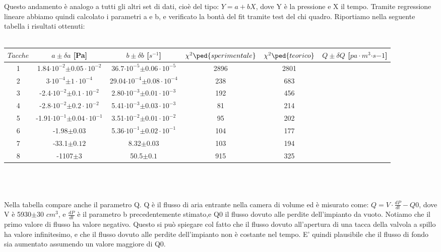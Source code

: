 \documentclass[a4paper,11pt]{article}
\begin{document}
Questo andamento è analogo a tutti gli altri set di dati, cioè del tipo: $Y=a+bX$, dove Y è la pressione e X il tempo. Tramite regressione lineare abbiamo quindi calcolato i parametri a e b, e verificato la bontà del fit tramite test del chi quadro. Riportiamo nella seguente tabella i risultati ottenuti:\\
\vspace{10 px}\\

\begin{tabular}{|c|c|c|c|c|c|}
\hline $Tacche$ & $a\pm$$\delta a$ [Pa] & $b\pm$$\delta b$ [$s^{-1}$] & $\chi^{2}\ped{sperimentale}$ & $\chi^{2}\ped{teorico}$ & $Q\pm\delta Q$ [$pa\cdot m^{3}$$\cdot s{-1}$] \\ 
\hline 1 & 1.84$\cdot10^{-2}$$\pm 0.05\cdot10^{-2}$ &  36.7$\cdot10^{-5}$$\pm 0.06\cdot10^{-5}$ & 2896 & 2801 &  \\ 
\hline 2 & 3$\cdot10^{-4}$$\pm 1\cdot10^{-4}$ & 29.04$\cdot10^{-4}$$\pm 0.08\cdot10^{-4}$ & 238 & 683 &  \\ 
\hline 3 & -2.4$\cdot10^{-2}$$\pm 0.1\cdot10^{-2}$ &  2.80$\cdot10^{-3}$$\pm 0.01\cdot10^{-3}$ & 192 & 456 &  \\ 
\hline 4 & -2.8$\cdot10^{-2}$$\pm 0.2\cdot10^{-2}$ &  5.41$\cdot10^{-3}$$\pm 0.03\cdot10^{-3}$ & 81 & 214 &  \\ 
\hline 5 & -1.91$\cdot10^{-1}$$\pm 0.04\cdot10^{-1}$ & 3.51$\cdot10^{-2}$$\pm 0.01\cdot10^{-2}$ & 95 & 202 &  \\ 
\hline 6 & -1.98$\pm 0.03$  & 5.36$\cdot10^{-1}$$\pm 0.02\cdot10^{-1}$ & 104 & 177 &  \\ 
\hline 7 & -33.1$\pm 0.12$ & 8.32$\pm 0.03$ & 103 & 194 &  \\ 
\hline 8 & -1107$\pm 3$ & 50.5$\pm 0.1$  & 915 & 325 &  \\ 
\hline 
\end{tabular} \\
\\
\\

Nella tabella compare anche il parametro Q. Q è il flusso di aria entrante nella camera di volume ed è misurato come:
$Q=V\cdot \frac{dP}{dt}-Q0$, dove V è 5930$\pm 30$ $cm^{3}$, e $\frac{dP}{dt}$ è il parametro b precedentemente stimato,e Q0 il flusso dovuto alle perdite dell'impianto da vuoto.  Notiamo che il primo valore di flusso ha valore negativo. Questo si può spiegare col fatto che il flusso dovuto all'apertura di una tacca della valvola a spillo ha valore infinitesimo, e che il flusso dovuto alle perdite dell'impianto non è costante nel tempo. E' quindi plausibile che il flusso di fondo sia aumentato assumendo un valore maggiore di Q0.
\end{document}
